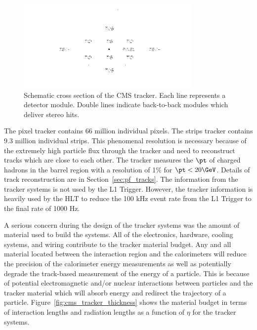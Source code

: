 \begin{figure}[htbp]
\centering
     \includegraphics[width=0.8\textwidth]{cms_and_lhc/plots/cms_tracker.png}
     \caption{
Schematic cross section of the CMS tracker. Each line represents a detector module. 
Double lines indicate back-to-back modules which deliver stereo hits.
     }
     \label{fig:cms_tracker}
\end{figure}

The pixel tracker contains 66 million individual pixels. The strips tracker
contains 9.3 million individual strips. This phenomenal resolution is necessary
because of the extremely high particle flux through the tracker and need to
reconstruct tracks which are close to each other.
The tracker measures the $\pt$ of 
charged hadrons in the barrel region with a resolution of 1\% for $\pt < 20\GeV$.
Details of track reconstruction are in Section~\ref{sec:pf_tracks}.
The information from the tracker systems is
not used by the L1 Trigger. However, the tracker information is heavily used by the HLT to
reduce the 100 kHz event rate from the L1 Trigger to the final rate of 1000 Hz.

A serious concern during the design of the tracker systems was the amount of
material used to build the systems. All of the electronics, hardware, 
cooling systems, and wiring contribute to the tracker material budget. Any and all material
located between the interaction region and the calorimeters will reduce the precision 
of the calorimeter energy measurements as well as potentially degrade the track-based
measurement of the energy of a particle. This is because of potential electromagnetic
and/or nuclear interactions between particles and the tracker material which will
absorb energy and redirect the trajectory of a particle. Figure~\ref{fig:cms_tracker_thickness}
shows the material budget in terms of interaction lengths and radiation lengths as a function
of $\eta$ for the tracker systems.

